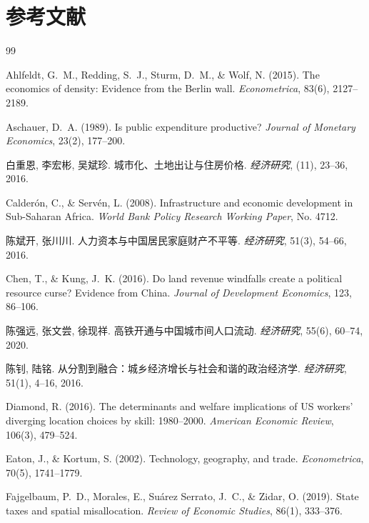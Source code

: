 \documentclass[UTF8,a4paper,12pt]{ctexart}
\theoremstyle{plain}
\theoremstyle{definition}
\theoremstyle{remark}
\begin{document}
\section*{参考文献}

\begin{thebibliography}{99}

Ahlfeldt, G.~M., Redding, S.~J., Sturm, D.~M., \& Wolf, N. (2015).
The economics of density: Evidence from the Berlin wall.
\textit{Econometrica}, 83(6), 2127--2189.

Aschauer, D.~A. (1989).
Is public expenditure productive?
\textit{Journal of Monetary Economics}, 23(2), 177--200.

白重恩, 李宏彬, 吴斌珍.
城市化、土地出让与住房价格.
\textit{经济研究}, (11), 23--36, 2016.

Calderón, C., \& Servén, L. (2008).
Infrastructure and economic development in Sub-Saharan Africa.
\textit{World Bank Policy Research Working Paper}, No. 4712.

陈斌开, 张川川.
人力资本与中国居民家庭财产不平等.
\textit{经济研究}, 51(3), 54--66, 2016.

Chen, T., \& Kung, J.~K. (2016).
Do land revenue windfalls create a political resource curse?
Evidence from China.
\textit{Journal of Development Economics}, 123, 86--106.

陈强远, 张文尝, 徐现祥.
高铁开通与中国城市间人口流动.
\textit{经济研究}, 55(6), 60--74, 2020.

陈钊, 陆铭.
从分割到融合：城乡经济增长与社会和谐的政治经济学.
\textit{经济研究}, 51(1), 4--16, 2016.

Diamond, R. (2016).
The determinants and welfare implications of US workers' diverging location choices by skill: 1980--2000.
\textit{American Economic Review}, 106(3), 479--524.

Eaton, J., \& Kortum, S. (2002).
Technology, geography, and trade.
\textit{Econometrica}, 70(5), 1741--1779.

Fajgelbaum, P.~D., Morales, E., Su\'{a}rez Serrato, J.~C., \& Zidar, O. (2019).
State taxes and spatial misallocation.
\textit{Review of Economic Studies}, 86(1), 333--376.


\end{thebibliography}
\end{document}
